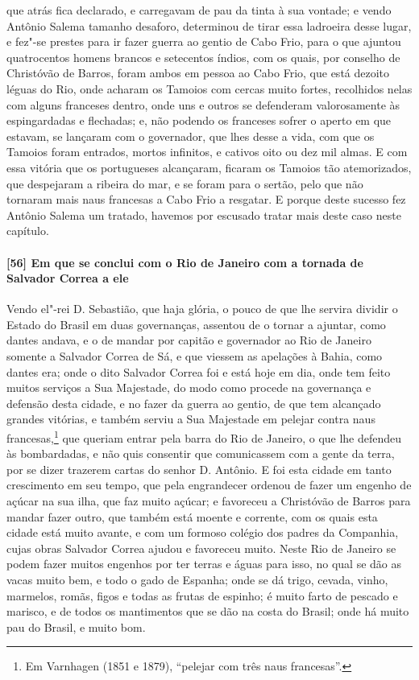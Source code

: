 \begin{linenumbers}
que atrás fica declarado, e carregavam de pau da tinta à sua vontade; e vendo Antônio
Salema tamanho desaforo, determinou de tirar essa ladroeira desse lugar, e fez"-se prestes
para ir fazer guerra ao gentio de Cabo Frio, para o que ajuntou quatrocentos homens
brancos e setecentos índios, com os quais, por conselho de Christóvão de Barros, foram
ambos em pessoa ao Cabo Frio, que está dezoito léguas do Rio, onde acharam os Tamoios com
cercas muito fortes, recolhidos nelas com alguns franceses dentro, onde uns e outros se
defenderam valorosamente às espingardadas e flechadas; e, não podendo os franceses sofrer
o aperto em que estavam, se lançaram com o governador, que lhes desse a vida, com que os
Tamoios foram entrados, mortos infinitos, e cativos oito ou dez mil almas. E com essa
vitória que os portugueses alcançaram, ficaram os Tamoios tão atemorizados, que despejaram
a ribeira do mar, e se foram para o sertão, pelo que não tornaram mais naus francesas a
Cabo Frio a resgatar. E porque deste sucesso fez Antônio Salema um tratado, havemos por
escusado tratar mais deste caso neste capítulo.

\paragraph{[56] Em que se conclui com o Rio de Janeiro com a tornada de Salvador Correa a
ele} \quad
Vendo el"-rei D. Sebastião, que haja glória, o pouco de que lhe servira dividir o Estado do
Brasil em duas governanças, assentou de o tornar a ajuntar, como dantes andava, e o de
mandar por capitão e governador ao Rio de Janeiro somente a Salvador Correa de Sá, e que
viessem as apelações à Bahia, como dantes era; onde o dito Salvador Correa foi e está hoje
em dia, onde tem feito muitos serviços a Sua Majestade, do modo como procede na governança
e defensão desta cidade, e no fazer da guerra ao gentio, de que tem alcançado grandes
vitórias, e também serviu a Sua Majestade em pelejar contra naus francesas,\footnote{ Em
Varnhagen (1851 e 1879), ``pelejar com três naus francesas''.} que queriam entrar pela
barra do Rio de Janeiro, o que lhe defendeu às bombardadas, e não quis consentir que
comunicassem com a gente da terra, por se dizer trazerem cartas do senhor D. Antônio. E
foi esta cidade em tanto crescimento em seu tempo, que pela engrandecer ordenou de fazer
um engenho de açúcar na sua ilha, que faz muito açúcar; e favoreceu a Christóvão de Barros
para mandar fazer outro, que também está moente e corrente, com os quais esta cidade está
muito avante, e com um formoso colégio dos padres da Companhia, cujas obras Salvador
Correa ajudou e favoreceu muito. Neste Rio de Janeiro se podem fazer muitos engenhos por
ter terras e águas para isso, no qual se dão as vacas muito bem, e todo o gado de Espanha;
onde se dá trigo, cevada, vinho, marmelos, romãs, figos e todas as frutas de espinho; é
muito farto de pescado e marisco, e de todos os mantimentos que se dão na costa do Brasil;
onde há muito pau do Brasil, e muito bom.


\end{linenumbers}
